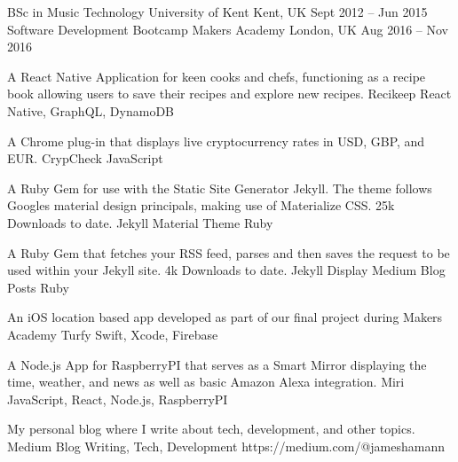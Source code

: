 \vspace{-7mm}
\begin{cventries}
	\cventry
	{BSc in Music Technology}
	{University of Kent}
	{Kent, UK}
	{Sept 2012 – Jun 2015}
	{}
	\cventry
	{Software Development Bootcamp}
	{Makers Academy}
	{London, UK}
	{Aug 2016 – Nov 2016}
	{}
\end{cventries}

\vspace{-2mm}
\vspace{28mm}
\begin{cventries}
	\cventry
	{A React Native Application for keen cooks and chefs, functioning as a recipe book allowing users to save their recipes and explore new recipes.}
	{Recikeep}
	{React Native, GraphQL, DynamoDB}
	{}
	{}
	
	\vspace{-5mm}
	\cventry
	{A Chrome plug-in that displays live cryptocurrency rates in USD, GBP, and EUR.}
	{CrypCheck}
	{JavaScript}
	{}
	{}
	
	\vspace{-5mm}
	\cventry
	{A Ruby Gem for use with the Static Site Generator Jekyll. The theme follows Google\textquotesingle{}s material design principals, making use of Materialize CSS. 25k Downloads to date.}
	{Jekyll Material Theme}
	{Ruby}
	{}
	{}
	
	\vspace{-5mm}
	\cventry
	{A Ruby Gem that fetches your RSS feed, parses and then saves the request to be used within your Jekyll site. 4k Downloads to date.}
	{Jekyll Display Medium Blog Posts}
	{Ruby}
	{}
	{}

	\vspace{-5mm}
	\cventry
	{An iOS location based app developed as part of our final project during Makers Academy}
	{Turfy}
	{Swift, Xcode, Firebase}
	{}
	{}

	\vspace{-5mm}
	\cventry
	{A Node.js App for RaspberryPI that serves as a Smart Mirror displaying the time, weather, and news as well as basic Amazon Alexa integration.}
	{Miri}
	{JavaScript, React, Node.js, RaspberryPI}
	{}
	{}
	{}
	{}

	\vspace{-5mm}
	\cventry
	{My personal blog where I write about tech, development, and other topics.}
	{Medium Blog}
	{Writing, Tech, Development}
	{https://medium.com/@jameshamann}
	{}
	{}
	{}
	{}
	{}
	{}
	
	\vspace{-5mm}
\end{cventries}

\ 
